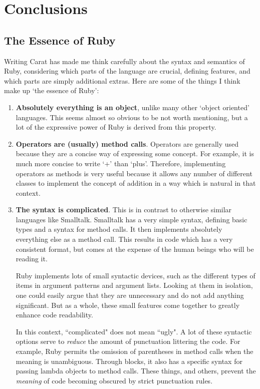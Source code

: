 \chapter{Conclusions}

\section{The Essence of Ruby}

Writing Carat has made me think carefully about the syntax and semantics of Ruby, considering which parts of the language are crucial, defining features, and which parts are simply additional extras. Here are some of the things I think make up `the essence of Ruby':

\begin{enumerate}
  \item \textbf{Absolutely everything is an object}, unlike many other `object oriented' languages. This seems almost so obvious to be not worth mentioning, but a lot of the expressive power of Ruby is derived from this property.
  
  \item \textbf{Operators are (usually) method calls}. Operators are generally used because they are a concise way of expressing some concept. For example, it is much more concise to write `+' than `plus'. Therefore, implementing operators as methods is very useful because it allows any number of different classes to implement the concept of addition in a way which is natural in that context.
  
  \item \textbf{The syntax is complicated}. This is in contrast to otherwise similar languages like Smalltalk. Smalltalk has a very simple syntax, defining basic types and a syntax for method calls. It then implements absolutely everything else as a method call. This results in code which has a very consistent format, but comes at the expense of the human beings who will be reading it.
  
  Ruby implements lots of small syntactic devices, such as the different types of items in argument patterns and argument lists. Looking at them in isolation, one could easily argue that they are unnecessary and do not add anything significant. But as a whole, these small features come together to greatly enhance code readability.
  
  In this context, ``complicated" does not mean ``ugly". A lot of these syntactic options serve to \emph{reduce} the amount of punctuation littering the code. For example, Ruby permits the omission of parentheses in method calls when the meaning is unambiguous. Through blocks, it also has a specific syntax for passing lambda objects to method calls. These things, and others, prevent the \emph{meaning} of code becoming obscured by strict punctuation rules.
  

\end{enumerate}
